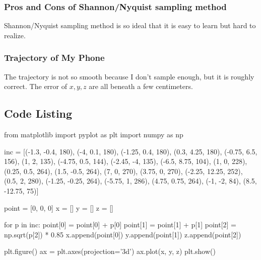 \documentclass{article}
\begin{document}
\subsubsection*{Pros and Cons of Shannon/Nyquist sampling method}
Shannon/Nyquist sampling method is so ideal that it is easy to learn but hard to realize.
\subsubsection*{Trajectory of My Phone}
The trajectory is not so smooth because I don't sample enough, but it is roughly correct. The error of $x, y, z$ are all beneath a few centimeters.



\begin{appendices}
\section{Code Listing}
\begin{python}
from matplotlib import pyplot as plt
import numpy as np

inc = [(-1.3, -0.4, 180),
(-4, 0.1, 180),
(-1.25, 0.4, 180),
(0.3, 4.25, 180),
(-0.75, 6.5, 156),
(1, 2, 135),
(-4.75, 0.5, 144),
(-2.45, -4, 135),
(-6.5, 8.75, 104),
(1, 0, 228),
(0.25, 0.5, 264),
(1.5, -0.5, 264),
(7, 0, 270),
(3.75, 0, 270),
(-2.25, 12.25, 252),
(0.5, 2, 280),
(-1.25, -0.25, 264),
(-5.75, 1, 286),
(4.75, 0.75, 264),
(-1, -2, 84),
(8.5, -12.75, 75)]

point = [0, 0, 0]
x = []
y = []
z = []

for p in inc:
    point[0] = point[0] + p[0]
    point[1] = point[1] + p[1]
    point[2] = np.sqrt(p[2]) * 0.85
    x.append(point[0])
    y.append(point[1])
    z.append(point[2])

plt.figure()
ax = plt.axes(projection='3d')
ax.plot(x, y, z)
plt.show()
\end{python}
\end{appendices}
\end{document}
